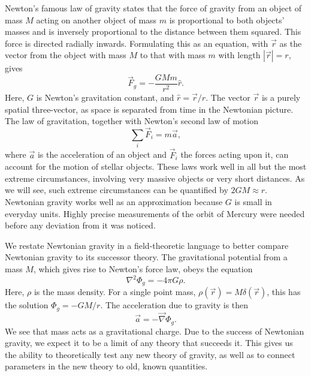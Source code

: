 Newton's famous law of gravity states that the force of gravity from an object of mass $M$ acting on another object of mass $m$ is proportional to both objects' masses and is inversely proportional to the distance between them squared.
This force is directed radially inwards.
Formulating this as an equation, with $\vec r$ as the vector from the object with mass $M$ to that with mass $m$ with length $|\vec r| = r$, gives
%
\begin{equation}
    \vec F_g = - \frac{G M m}{r^2} \hat r.
\end{equation}
%
Here, $G$ is Newton's gravitation constant, and $\hat r = \vec r / r$.
The vector $\vec r$ is a purely spatial three-vector, as space is separated from time in the Newtonian picture.
The law of gravitation, together with Newton's second law of motion
%
\begin{equation}
    \label{Newton's second law}
    \sum_i \vec F_i = m \vec a,
\end{equation}
%
where $\vec a$ is the acceleration of an object and $\vec F_i$ the forces acting upon it, can account for the motion of stellar objects.
These laws work well in all but the most extreme circumstances, involving very massive objects or very short distances.
As we will see, such extreme circumstances can be quantified by $2G M \approx r$.
Newtonian gravity works well as an approximation because $G$ is small in everyday units.
Highly precise measurements of the orbit of Mercury were needed before any deviation from it was noticed.

We restate Newtonian gravity in a field-theoretic language to better compare Newtonian gravity to its successor theory.
The gravitational potential from a mass $M$, which gives rise to Newton's force law, obeys the equation
%
\begin{equation}
    \nabla^2 \Phi_g = - 4 \pi G \rho.
\end{equation}
%
Here, $\rho$ is the mass density.
For a single point mass, $\rho(\vec r) = M \delta(\vec r)$, this has the solution $\Phi_g = -G M / r$.
The acceleration due to gravity is then
%
\begin{equation}
    \label{acceleration from Newtonian gravitational potential}
    \vec a = - \vec \nabla \Phi_g.
\end{equation}
%
We see that mass acts as a gravitational charge.
Due to the success of Newtonian gravity, we expect it to be a limit of any theory that succeeds it.
This gives us the ability to theoretically test any new theory of gravity, as well as to connect parameters in the new theory to old, known quantities.



